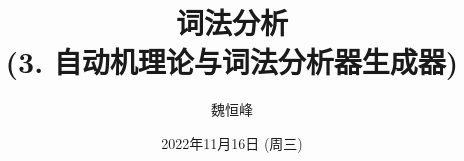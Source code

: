 \documentclass[]{beamer}
\title[词法分析]{词法分析 \\ (3. 自动机理论与词法分析器生成器)}
\author[魏恒峰]{\large 魏恒峰}
\institute{hfwei@nju.edu.cn}
\date{2022年11月16日 (周三)}
\begin{document}
\maketitle









\thankyou{}

\end{document}
